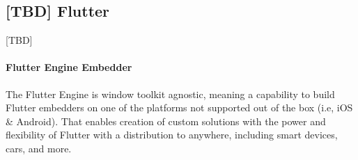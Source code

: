 
\subsection{[TBD] Flutter}

[TBD]

\paragraph{Flutter Engine Embedder}

The Flutter Engine is window toolkit agnostic, meaning a capability to build Flutter embedders on one of the platforms 
not supported out of the box (i.e, iOS \& Android). That enables creation of custom solutions with the power and 
flexibility of Flutter with a distribution to anywhere, including smart devices, cars, and more.
